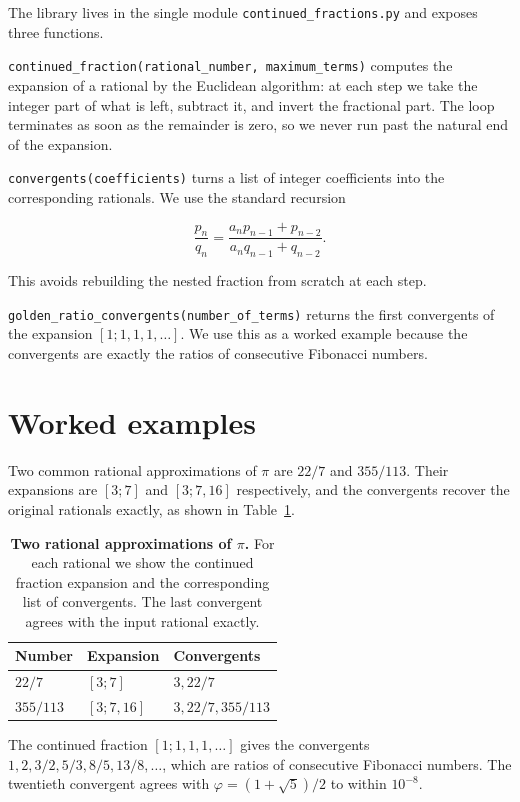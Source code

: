 \documentclass[11pt]{article}
\begin{document}
The library lives in the single module \texttt{continued\_fractions.py}
and exposes three functions.

\texttt{continued\_fraction(rational\_number,
maximum\_terms)} computes the expansion of a rational by the Euclidean
algorithm: at each step we take the integer part of what is left,
subtract it, and invert the fractional part. The loop terminates as
soon as the remainder is zero, so we never run past the natural end of
the expansion.

\texttt{convergents(coefficients)} turns a
list of integer coefficients into the corresponding rationals. We use
the standard recursion

\[
    \frac{p_n}{q_n}
    = \frac{a_n p_{n - 1} + p_{n - 2}}{a_n q_{n - 1} + q_{n - 2}}.
\]

This avoids rebuilding the nested fraction from scratch at each step.

\texttt{golden\_ratio\_convergents(number\_of\_terms)} returns the
first convergents of the expansion \([1; 1, 1, 1, \dots]\). We use this
as a worked example because the convergents are exactly the ratios of
consecutive Fibonacci numbers.

\section{Worked examples}

Two common rational
approximations of \(\pi\) are \(22/7\) and \(355/113\). Their
expansions are \([3; 7]\) and \([3; 7, 16]\) respectively, and the
convergents recover the original rationals exactly, as shown in
Table~\ref{tab:pi}.

\begin{table}[h]
\centering
\begin{tabular}{l l l}
\toprule
Number & Expansion & Convergents \\
\midrule
\(22/7\)    & \([3; 7]\)     & \(3, 22/7\) \\
\(355/113\) & \([3; 7, 16]\) & \(3, 22/7, 355/113\) \\
\bottomrule
\end{tabular}
\caption{\textbf{Two rational approximations of \(\pi\).} For each
rational we show the continued fraction expansion and the
corresponding list of convergents. The last convergent agrees with the
input rational exactly.}
\label{tab:pi}
\end{table}

The continued fraction
\([1; 1, 1, 1, \dots]\) gives the convergents \(1, 2, 3/2, 5/3, 8/5,
13/8, \dots\), which are ratios of consecutive Fibonacci numbers. The
twentieth convergent agrees with \(\varphi = (1 + \sqrt{5}) / 2\) to
within \(10^{-8}\).
\end{document}
